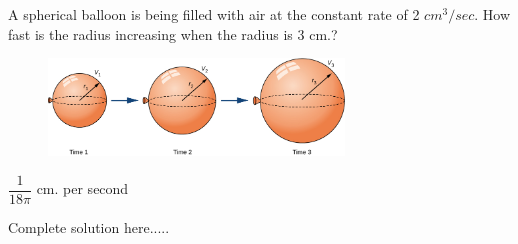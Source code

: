 \begin{example}
A spherical balloon is being filled with air at the constant rate of 2 $cm^3/sec$. How fast is the radius increasing when the radius is 3 cm.?

\begin{figure}[h!]
    \centering
    \includegraphics[width=0.7\textwidth]{images/implicitDiff/ballon.jpg}
\end{figure}
    \begin{sol}
    $\dfrac{1}{18\pi}$ cm. per second
    \end{sol}
    \begin{solL}
    Complete solution here.....
    
    \end{solL}
    
\end{example}
\newpage

